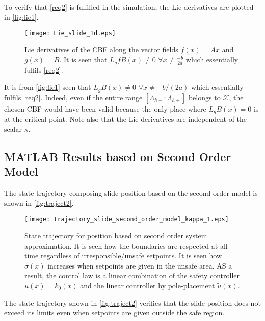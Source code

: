 To verify that \autoref{req2} is fulfilled in the simulation, the Lie derivatives are plotted in \autoref{fig:lie1}.
\begin{figure}[H]
	\center
		\texttt{[image: Lie\_slide\_1d.eps]}
	\caption{Lie derivatives of the CBF along the vector fields $f(x) = Ax$ and $g(x)=B$. It is seen that $L_gfB(x) \neq 0 \,\, \forall x \neq \frac{-b}{2a}$ which essentially fulfils \autoref{req2}.}
	\label{fig:lie1}
\end{figure}
It is from \autoref{fig:lie1} seen that $L_gB(x) \neq 0 \,\, \forall x \neq -b/(2a)$ which essentially fulfils \autoref{req2}. Indeed, even if the entire range $[\Lambda_{h-}:\Lambda_{h+}]$ belongs to $\mathcal{X}$, the chosen CBF would have been valid because the only place where $L_gB(x) = 0$ is at the critical point. Note also that the Lie derivatives are independent of the scalar $\kappa$.
\vspace{-0.3cm}
\subsection{MATLAB Results based on Second Order Model}\label{subsec:matlab-resutls-2-order}
\vspace{-0.2cm}
The state trajectory composing slide position based on the second order model is shown in \autoref{fig:traject2}.
\begin{figure}[H]
	\center
		\texttt{[image: trajectory\_slide\_second\_order\_model\_kappa\_1.eps]}
	\caption{State trajectory for position based on second order system approximation. It is seen how the boundaries are respected at all time regardless of irresponsible/unsafe setpoints. It is seen how $\sigma(x)$ 	increases when setpoints are given in the unsafe area. AS a result, the control law is a linear combination of the safety controller $u(x) = k_0(x)$ and the linear controller by pole-placement $\tilde{u}(x)$.}
	\label{fig:traject2}
\end{figure}
The state trajectory shown in \autoref{fig:traject2} verifies that the slide position does not exceed its limits even when setpoints are given outside the safe region.


